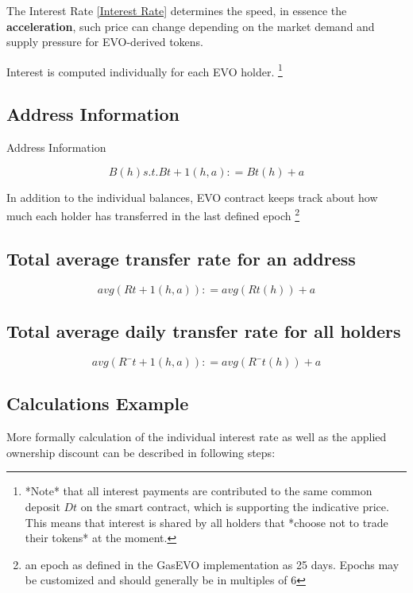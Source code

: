 The Interest Rate \ref{Interest Rate} determines the speed, in essence the \textbf{acceleration}, such price can change depending on the market demand and supply pressure for EVO-derived tokens.

Interest is computed individually for each EVO holder. \footnote{
*Note* that all interest payments are contributed to the same common deposit $Dt$ on the smart contract, which is supporting the indicative price. This means that interest is shared by all holders that *choose not to trade their tokens* at the moment.}




\label{sec:Calculations}
\subsection{Address Information}
Address Information


\begin{equation}
	B(h) s.t. Bt + 1(h, a): = Bt(h) + a 
\end{equation}


In addition to the individual balances, EVO contract keeps track about how much each holder has transferred in the last defined epoch \footnote{an epoch as defined in the GasEVO implementation as 25 days. Epochs may be customized and should generally be in multiples of 6}

\label{sec:Calculations}
\subsection{Total average transfer rate for an address}

\begin{equation}
	avg(Rt + 1(h, a)): = avg(Rt(h)) + a
\end{equation}


\label{sec:Calculations}
\subsection{Total average daily transfer rate for all holders}
\begin{equation}
	avg(R¯ t + 1(h, a)): = avg(R¯t(h)) + a
\end{equation}

\subsection{Calculations Example}
More formally calculation of the individual interest rate as well as the applied ownership discount can be described in following steps:

